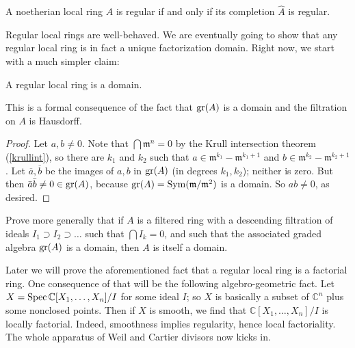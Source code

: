 \begin{proposition}
A noetherian local ring $A$ is regular if and only if its completion $\hat{A}$ is regular.
\end{proposition}

Regular local rings are well-behaved. We are eventually going to show that any
regular local ring is in fact a unique factorization domain. 
Right now, we start with a much simpler claim:

\begin{proposition} A regular local ring is a domain.
\label{reg loc means domain}
\label{regdomain}
\end{proposition}
This is a formal consequence of the fact that $\operatorname{gr}(A)$ is a domain and the
filtration on $A$ is Hausdorff.
\begin{proof} Let $a,b \neq 0$. Note that $\bigcap \mathfrak{m}^n=0$ by the
Krull intersection theorem (\cref{krullint}), so there are $k_1$ and $k_2$ such that 
$a \in \mathfrak{m}^{k_1} - \mathfrak{m}^{k_1 + 1}$ and $b \in
\mathfrak{m}^{k_2} - \mathfrak{m}^{k_2 + 1}$.
Let $\overline{a}, \overline{b}$ be the images of $a,b$ in $\operatorname{gr}(A)$ (in
degrees $k_1, k_2$); neither is
zero.
But then $\bar{a}\bar{b} \neq 0 \in \operatorname{gr}(A)$, because $\operatorname{gr}(A)=\mathrm{Sym}(\mathfrak{m}/\mathfrak{m}^2)$ is a domain. So $ab \neq 0$, as desired.
\end{proof}

\begin{exercise} 
Prove more generally that if $A$ is a filtered ring with a descending
filtration of ideals $I_1 \supset I_2 \supset \dots$ such that $\bigcap I_k =
0$, and such that the associated graded algebra $\operatorname{gr}(A)$ is a domain, then $A$
is itself a domain.
\end{exercise} 

Later we will prove the aforementioned fact that a regular local ring is a factorial
ring. One consequence of
that will be the following algebro-geometric fact. Let $X = \operatorname{Spec}
\mathbb{C}[X_1, \dots, X_n]/I$ for some ideal $I$; so $X$ is basically a subset
of $\mathbb{C}^n$ plus some nonclosed points. Then if $X$ is smooth, we find
that $\mathbb{C}[X_1, \dots, X_n]/I$ is locally factorial. Indeed, smoothness
implies regularity, hence local factoriality. The whole apparatus of Weil and
Cartier divisors now kicks in.

